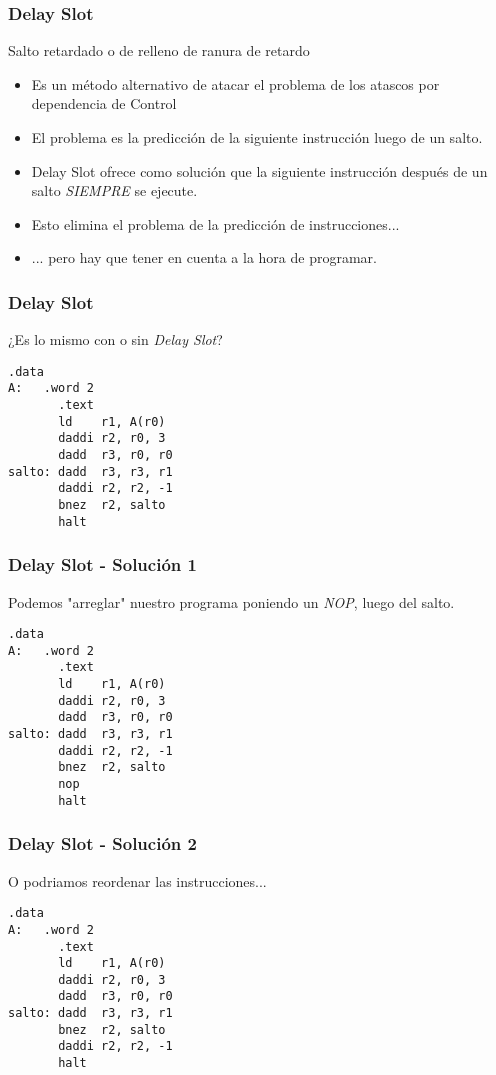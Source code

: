\documentclass{beamer}
\begin{document}
\begin{frame}
\frametitle{Delay Slot}
Salto retardado o de relleno de ranura de retardo
\begin{itemize}
\item Es un método alternativo de atacar el problema de los atascos por dependencia de Control
\item El problema es la predicción de la siguiente instrucción luego de un salto.
\item Delay Slot ofrece como solución que la siguiente instrucción después de un salto \emph{SIEMPRE} se ejecute.
\item Esto elimina el problema de la predicción de instrucciones...
\item ... pero hay que tener en cuenta a la hora de programar.

\end{itemize}
\end{frame}

\begin{frame}[fragile]
\frametitle{Delay Slot}
¿Es lo mismo con o sin \emph{Delay Slot}?
\begin{block}{}
\begin{lstlisting}[language=WinMIPS64,basicstyle=\ttfamily,keywordstyle=\color{blue}]
       .data
A:   .word 2
       .text
       ld    r1, A(r0)
       daddi r2, r0, 3
       dadd  r3, r0, r0
salto: dadd  r3, r3, r1
       daddi r2, r2, -1
       bnez  r2, salto
       halt
\end{lstlisting}
\end{block}
\end{frame}


\begin{frame}[fragile]
\frametitle{Delay Slot - Solución 1 }
Podemos "arreglar" nuestro programa poniendo un \emph{NOP}, luego del salto.
\begin{block}{}
\begin{lstlisting}[language=WinMIPS64,basicstyle=\ttfamily,keywordstyle=\color{blue}]
       .data
A:   .word 2
       .text
       ld    r1, A(r0)
       daddi r2, r0, 3
       dadd  r3, r0, r0
salto: dadd  r3, r3, r1
       daddi r2, r2, -1
       bnez  r2, salto
       nop
       halt
\end{lstlisting}
\end{block}
\end{frame}


\begin{frame}[fragile]
\frametitle{Delay Slot - Solución 2 }
O podriamos reordenar las instrucciones...
\begin{block}{}
\begin{lstlisting}[language=WinMIPS64,basicstyle=\ttfamily,keywordstyle=\color{blue}]
       .data
A:   .word 2
       .text
       ld    r1, A(r0)
       daddi r2, r0, 3
       dadd  r3, r0, r0
salto: dadd  r3, r3, r1
       bnez  r2, salto
       daddi r2, r2, -1
       halt
\end{lstlisting}
\end{block}
\end{frame}
\end{document}
